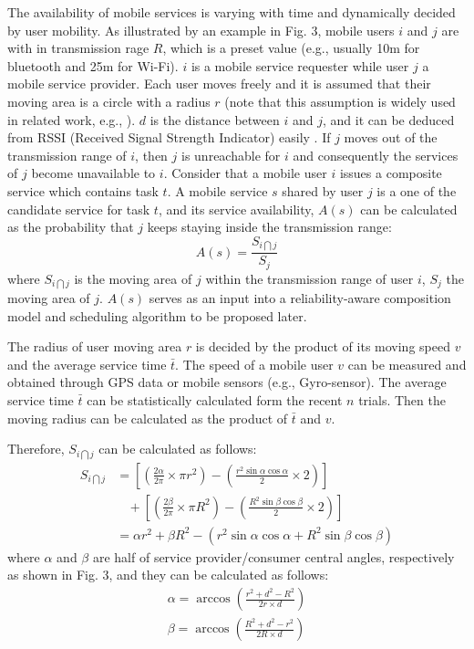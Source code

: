 \documentclass[journal]{IEEEtran}
\begin{document}
The availability of mobile services is varying with time and dynamically decided by user mobility. 
As illustrated by an example in Fig. 3, mobile users $i$ and $j$ are with in transmission rage $R$, which is a preset value (e.g., usually 10m for bluetooth and 25m for Wi-Fi). $i$ is a mobile service requester while user $j$ a mobile service provider. Each user moves freely and it is assumed that their moving area is a circle with a radius $r$ (note that this assumption is widely used in related work, e.g., \cite{Yang2010, Deng2017, wu2001personal}). $d$ is the distance between $i$ and $j$, and it can be deduced from RSSI (Received Signal Strength Indicator) easily \cite{benkic2008using}. If $j$ moves out of the transmission range of $i$, then $j$ is unreachable for $i$ and consequently the services of $j$ become unavailable to $i$.
Consider that a mobile user $i$ issues a composite service which contains task $t$. A mobile service $s$ shared by user $j$ is a one of the candidate service for task $t$, and its service availability, $A(s)$ can be calculated as the probability that $j$ keeps staying inside the transmission range:
\begin{equation}
A(s) = \frac{S_{i \bigcap j}}{S_j}
\end{equation}
where $S_{i \bigcap j}$ is the moving area of $j$ within the transmission range of user $i$, $S_j$ the moving area of $j$. $A(s)$ serves as an input into a reliability-aware composition model and scheduling algorithm to be proposed later.

The radius of user moving area $r$ is decided by the product of its moving speed $v$ and the average service time $\bar{t}$. 
The speed of a mobile user $v$ can be measured and obtained through GPS data or mobile sensors (e.g., Gyro-sensor).
The average service time $\bar{t}$ can be statistically calculated form the recent $n$ trials.
Then the moving radius can be calculated as the product of $\bar{t}$ and $v$.

Therefore, $S_{i \bigcap j}$ can be calculated as follows:
\begin{align}
S_{i \bigcap j} & =  [(\frac{2\alpha}{2\pi} \times \pi r^2)-(\frac{r^2 \sin\alpha \cos\alpha}{2} \times 2)]\\\nonumber
& \ \ \ \ +[(\frac{2\beta}{2\pi} \times \pi R^2)-(\frac{R^2 \sin\beta \cos\beta}{2} \times 2)]\\\nonumber
& = \alpha r^2 + \beta R^2 - (r^2 \sin\alpha \cos\alpha + R^2 \sin\beta \cos\beta)
\end{align}
where $\alpha$ and $\beta$ are half of service provider/consumer central angles, respectively as shown in Fig. 3, and they can be calculated as follows:
\begin{eqnarray}
\alpha = \arccos(\frac{r^2+d^2-R^2}{2r\times d}) \\\nonumber
\beta = \arccos(\frac{R^2+d^2-r^2}{2R\times d})
\end{eqnarray}
\end{document}
